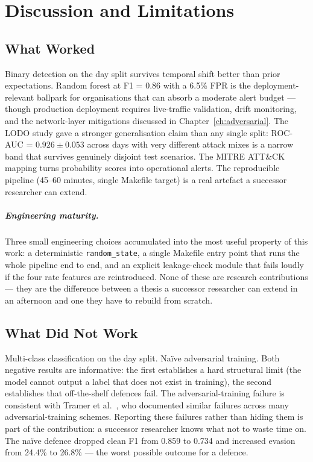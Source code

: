 \chapter{Discussion and Limitations}
\label{ch:discussion}

\section{What Worked}

Binary detection on the day split survives temporal shift better than
prior expectations. Random forest at F1 = 0.86 with a 6.5\% FPR is the
deployment-relevant ballpark for organisations that can absorb a
moderate alert budget --- though production deployment requires
live-traffic validation, drift monitoring, and the network-layer
mitigations discussed in Chapter~\ref{ch:adversarial}. The LODO study
gave a stronger generalisation claim than any single split: ROC-AUC =
$0.926 \pm 0.053$ across days with very different attack mixes is a
narrow band that survives genuinely disjoint test scenarios. The MITRE
ATT\&CK mapping turns probability scores into operational alerts. The
reproducible pipeline (45--60 minutes, single Makefile target) is a
real artefact a successor researcher can extend.

\paragraph{Engineering maturity.}
Three small engineering choices accumulated into the most useful
property of this work: a deterministic \texttt{random\_state}, a single
Makefile entry point that runs the whole pipeline end to end, and an
explicit leakage-check module that fails loudly if the four rate
features are reintroduced. None of these are research contributions ---
they are the difference between a thesis a successor researcher can
extend in an afternoon and one they have to rebuild from scratch.

\section{What Did Not Work}

Multi-class classification on the day split. Naïve adversarial training.
Both negative results are informative: the first establishes a hard
structural limit (the model cannot output a label that does not exist in
training), the second establishes that off-the-shelf defences fail. The
adversarial-training failure is consistent with Tramer et
al.~\cite{Tramer2020}, who documented similar failures across many
adversarial-training schemes. Reporting these failures rather than
hiding them is part of the contribution: a successor researcher knows
what not to waste time on. The naïve defence dropped clean F1 from
0.859 to 0.734 and increased evasion from 24.4\% to 26.8\% --- the
worst possible outcome for a defence.

